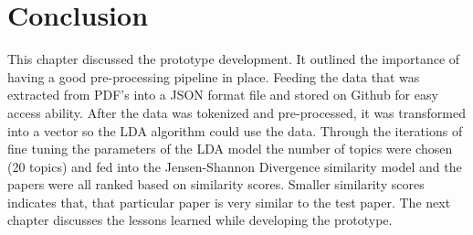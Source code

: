 \section{Conclusion}
This chapter discussed the prototype development. It outlined the importance of having a good pre-processing pipeline in place. Feeding the data that was extracted from PDF's into a JSON format file and stored on Github for easy access ability. After the data was tokenized and pre-processed, it was transformed into a vector so the LDA algorithm could use the data. Through the iterations of fine tuning the parameters of the LDA model the number of topics were chosen (20 topics) and fed into the Jensen-Shannon Divergence similarity model and the papers were all ranked based on similarity scores. Smaller similarity scores indicates that, that particular paper is very similar to the test paper.
The next chapter discusses the lessons learned while developing the prototype.